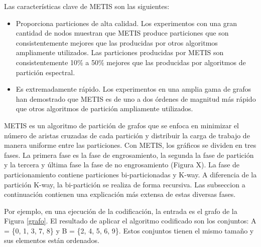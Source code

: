 Las características clave de METIS son las siguientes:

\begin{itemize}
	\item Proporciona particiones de alta calidad. Los experimentos con una gran cantidad de nodos muestran que METIS produce particiones que son consistentemente mejores que las producidas por otros algoritmos ampliamente utilizados. Las particiones producidas por METIS son consistentemente 10\% a 50\% mejores que las producidas por algoritmos de partición espectral.
	\item Es extremadamente rápido. Los experimentos en una amplia gama de grafos han demostrado que METIS es de uno a dos órdenes de magnitud más rápido que otros algoritmos de partición ampliamente utilizados.
\end{itemize}

METIS es un algoritmo de partición de grafos que se enfoca en minimizar el número de aristas cruzadas de cada partición y distribuir la carga de trabajo de manera uniforme entre las particiones. Con METIS, los gráficos se dividen en tres fases. La primera fase es la fase de engrosamiento, la segunda la fase de partición y la tercera y última fase la fase de no engrosamiento (Figura X). La fase de particionamiento contiene particiones bi-particionadas y K-way. A diferencia de la partición K-way, la bi-partición se realiza de forma recursiva. Las subseccion a continuación contienen una explicación más extensa de estas diversas fases.

Por ejemplo, en una ejecución de la codificación, la entrada es el grafo de la Figura \ref{grafo}. El resultado de aplicar el algoritmo codificado son los conjuntos: A = \{0, 1, 3, 7, 8\} y B = \{2, 4, 5, 6, 9\}. Estos conjuntos tienen el mismo tamaño y sus elementos están ordenados.